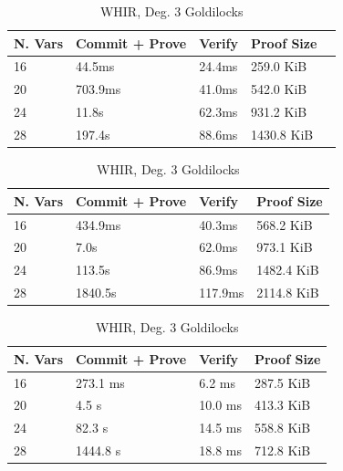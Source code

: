 \begin{table}[H]

\centering
\renewcommand{\arraystretch}{0.6}
\setlength{\tabcolsep}{5pt}
\begin{tabular}{ l l l l l }
N. Vars & Commit + Prove & Verify & Proof Size \\
\hline
16 & 44.5ms & 24.4ms & 259.0 KiB \\
20 & 703.9ms & 41.0ms & 542.0 KiB \\
24 & 11.8s & 62.3ms & 931.2 KiB \\
28 & 197.4s & 88.6ms & 1430.8 KiB \\
\end{tabular}
\captionsetup{skip=5pt}
\caption{Microlotus PCS, Odd Prime Tower}

\centering
\renewcommand{\arraystretch}{0.6}
\setlength{\tabcolsep}{5pt}
\begin{tabular}{ l l l l }
N. Vars & Commit + Prove & Verify & Proof Size \\
\hline
16 & 434.9ms & 40.3ms & 568.2 KiB \\
20 & 7.0s & 62.0ms & 973.1 KiB \\
24 & 113.5s & 86.9ms & 1482.4 KiB \\
28 & 1840.5s & 117.9ms & 2114.8 KiB \\
\end{tabular}
\captionsetup{skip=5pt}
\caption{Basefold, Deg. 3 Goldilocks}


\centering
\renewcommand{\arraystretch}{0.6}
\setlength{\tabcolsep}{5pt}
\begin{tabular}{ l l l l }
N. Vars & Commit + Prove & Verify & Proof Size \\
\hline
16  & 273.1 ms & 6.2 ms  & 287.5 KiB \\
20  & 4.5 s    & 10.0 ms & 413.3 KiB \\
24  & 82.3 s   & 14.5 ms & 558.8 KiB \\
28  & 1444.8 s & 18.8 ms & 712.8 KiB \\
\end{tabular}
\captionsetup{skip=5pt}
\caption{WHIR, Deg. 3 Goldilocks}


\end{table}
